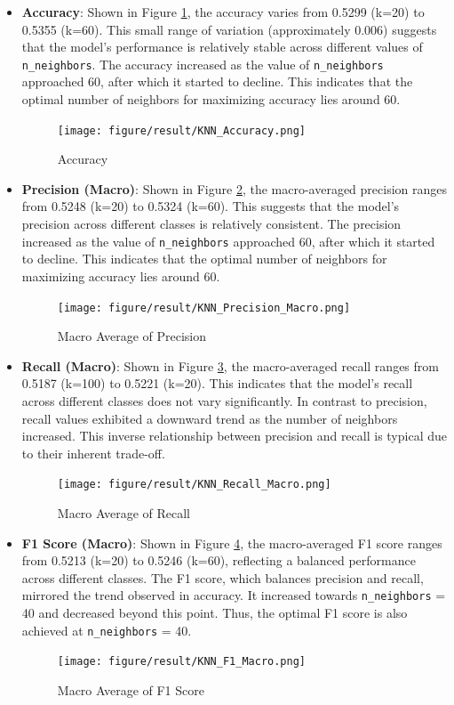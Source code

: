 \documentclass[times, twocolumn]{article}
\begin{document}
\begin{itemize}
    \item \textbf{Accuracy}: Shown in Figure \ref{fig:accuracy}, the accuracy varies from 0.5299 (k=20) to 0.5355 (k=60). This small range of variation (approximately 0.006) suggests that the model's performance is relatively stable across different values of \verb|n_neighbors|. The accuracy increased as the value of \verb|n_neighbors| approached 60, after which it started to decline. This indicates that the optimal number of neighbors for maximizing accuracy lies around 60.
    \begin{figure}[H]
        \centering
        \texttt{[image: figure/result/KNN\_Accuracy.png]}
        \caption{Accuracy}
        \label{fig:accuracy}
    \end{figure}
    
    \item \textbf{Precision (Macro)}: Shown in Figure \ref{fig:precision}, the macro-averaged precision ranges from 0.5248 (k=20) to 0.5324 (k=60). This suggests that the model's precision across different classes is relatively consistent. The precision increased as the value of \verb|n_neighbors| approached 60, after which it started to decline. This indicates that the optimal number of neighbors for maximizing accuracy lies around 60.
    \begin{figure}[H]
        \centering
        \texttt{[image: figure/result/KNN\_Precision\_Macro.png]}
        \caption{Macro Average of Precision}
        \label{fig:precision}
    \end{figure}

    \item \textbf{Recall (Macro)}: Shown in Figure \ref{fig:recall}, the macro-averaged recall ranges from 0.5187 (k=100) to 0.5221 (k=20). This indicates that the model's recall across different classes does not vary significantly. In contrast to precision, recall values exhibited a downward trend as the number of neighbors increased. This inverse relationship between precision and recall is typical due to their inherent trade-off.
    \begin{figure}[H]
        \centering
        \texttt{[image: figure/result/KNN\_Recall\_Macro.png]}
        \caption{Macro Average of Recall}
        \label{fig:recall}
    \end{figure}
    
    \item \textbf{F1 Score (Macro)}: Shown in Figure \ref{fig:f1}, the macro-averaged F1 score ranges from 0.5213 (k=20) to 0.5246 (k=60), reflecting a balanced performance across different classes. The F1 score, which balances precision and recall, mirrored the trend observed in accuracy. It increased towards \verb|n_neighbors| = 40 and decreased beyond this point. Thus, the optimal F1 score is also achieved at \verb|n_neighbors| = 40.
    \begin{figure}[H]
        \centering
        \texttt{[image: figure/result/KNN\_F1\_Macro.png]}
        \caption{Macro Average of F1 Score}
        \label{fig:f1}
    \end{figure}
\end{itemize}
\end{document}

